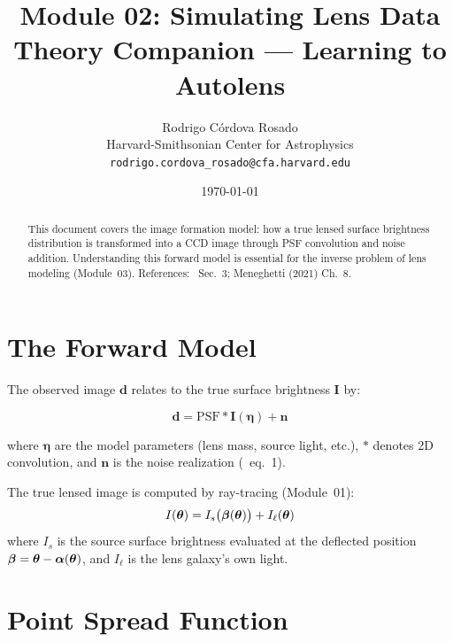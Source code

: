 \documentclass[11pt, letterpaper]{article}
\title{\textbf{Module 02: Simulating Lens Data}\\[0.5em]
\large Theory Companion — Learning to Autolens}
\author{Rodrigo C\'ordova Rosado\\
\small Harvard-Smithsonian Center for Astrophysics\\
\small \texttt{rodrigo.cordova\_rosado@cfa.harvard.edu}}
\date{\today}
\begin{document}
\maketitle

\begin{abstract}
This document covers the image formation model: how a true lensed
surface brightness distribution is transformed into a CCD image through
PSF convolution and noise addition. Understanding this forward model is
essential for the inverse problem of lens modeling (Module~03).
References: \Night\ Sec.~3; Meneghetti (2021) Ch.~8.
\end{abstract}

\tableofcontents
\newpage

\section{The Forward Model}
\label{sec:forward-model}

The observed image $\mathbf{d}$ relates to the true surface brightness
$\mathbf{I}$ by:

\begin{keyresult}
\begin{equation}
\mathbf{d} = \mathrm{PSF} \ast \mathbf{I}(\bm{\eta}) + \mathbf{n}
\label{eq:forward-model}
\end{equation}
\end{keyresult}

\noindent where $\bm{\eta}$ are the model parameters (lens mass, source
light, etc.), $\ast$ denotes 2D convolution, and $\mathbf{n}$ is the
noise realization (\Night\ eq.~1).

The true lensed image is computed by ray-tracing (Module~01):
\begin{equation}
I(\bm{\theta}) = I_s\bigl(\bm{\beta}(\bm{\theta})\bigr) + I_\ell(\bm{\theta})
\label{eq:lensed-image}
\end{equation}
where $I_s$ is the source surface brightness evaluated at the
deflected position $\bm{\beta} = \bm{\theta} - \bm{\alpha}(\bm{\theta})$, and $I_\ell$
is the lens galaxy's own light.

\section{Point Spread Function}
\label{sec:psf}
\end{document}
